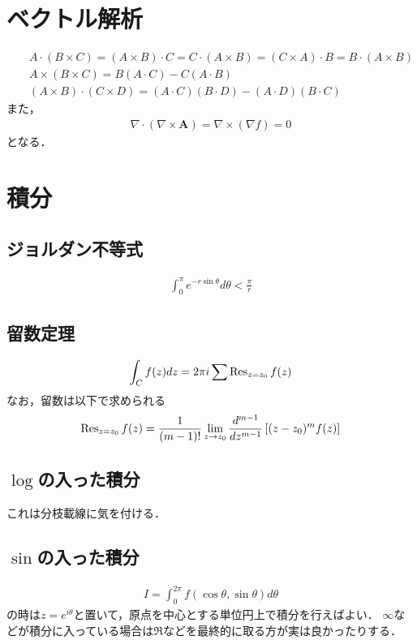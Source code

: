 \documentclass[12pt,dvipdfmx]{jsarticle}
\begin{document}
\section*{\Large{ベクトル解析}}
\begin{eqnarray}
  &&A\cdot (B\times C) = (A\times B)\cdot C = C\cdot (A\times B) = (C\times A)\cdot B = B\cdot (A\times B)\\
  &&A\times (B\times C) = B(A\cdot C) - C(A\cdot B)\\
  &&(A\times B)\cdot(C\times D)= (A\cdot C)(B\cdot D) - (A\cdot D)(B\cdot C)
\end{eqnarray}
また，
\begin{eqnarray}
  \nabla\cdot(\nabla\times\bm{A})= \nabla\times(\nabla f)=0
\end{eqnarray}
となる．

\section*{\Large{積分}}
\subsection*{ジョルダン不等式}
\begin{eqnarray}
  \int_0^\pi e^{-r\sin\theta}d\theta < \frac{\pi}{r}
\end{eqnarray}
\subsection*{留数定理}
\begin{eqnarray}
  \int_C f(z)dz= 2\pi i \sum \Res_{z=z_0}f(z)
\end{eqnarray}
なお，留数は以下で求められる
\begin{eqnarray}
  \Res_{z=z_0}f(z) = \frac{1}{(m-1)!}\lim_{z\to z_0}\frac{d^{m-1}}{dz^{m-1}}\left[ (z-z_0)^m f(z) \right]
\end{eqnarray}
\subsection*{$\log$の入った積分}
これは分枝載線に気を付ける．
\subsection*{$\sin$の入った積分}
\begin{eqnarray}
  I = \int_0^{2\pi}f(\cos\theta,\sin\theta)d\theta
\end{eqnarray}
の時は$z=e^{i\theta}$と置いて，原点を中心とする単位円上で積分を行えばよい．
$\infty$などが積分に入っている場合は$\Re$などを最終的に取る方が実は良かったりする．
\end{document}
